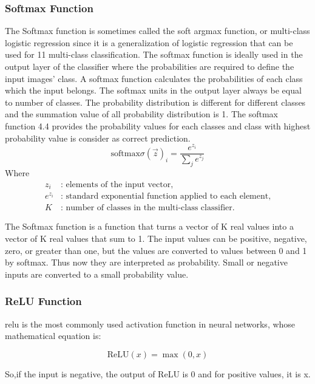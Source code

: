 \documentclass{ioereport}
\begin{document}
\subsubsection{Softmax Function}
The Softmax function is sometimes called the soft argmax function, or multi-class
logistic regression since it is a generalization of logistic regression that can be used for
11 multi-class classification. The softmax function is ideally used in the output layer of the classifier where the probabilities are required to define the input images’ class. A
softmax function calculates the probabilities of each class which the input belongs. The
softmax units in the output layer always be equal to number of classes. The probability
distribution is different for different classes and the summation value of all probability
distribution is 1. The softmax function 4.4 provides the probability values for each
classes and class with highest probability value is consider as correct prediction.
\begin{equation}
\text{softmax}\sigma(\vec{z})_i = \frac{e^{z_i}}{\sum_{j} e^{z_j}}
\end{equation}
Where
\begin{align*}
    z_i &: \text{ elements of the input vector,} \\
    e^{z_i} &: \text{ standard exponential function applied to each element,} \\
    K &: \text{ number of classes in the multi-class classifier.}
\end{align*}\quad



The Softmax function is a function that turns a vector of K real values into a vector of
K real values that sum to 1. The input values can be positive, negative, zero, or greater
than one, but the values are converted to values between 0 and 1 by softmax. Thus now
they are interpreted as probability. Small or negative inputs are converted to a small
probability value.

\subsubsection{ReLU Function}
\gls{relu} is the most commonly used activation function in neural networks, whose
mathematical equation is: 

\begin{equation}
\text{ReLU}(x) = \max(0, x)
\end{equation}

So,if the input is negative, the output of ReLU is 0 and for positive values, it is x.
\end{document}

